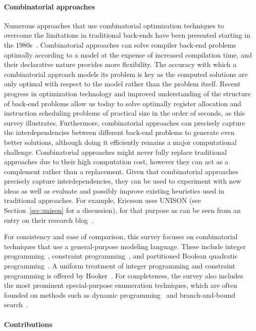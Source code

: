 \documentclass[acmsmall,authorversion,nonacm]{acmart}
\begin{document}
\paragraph{Combinatorial approaches}

Numerous approaches that use combinatorial optimization techniques to
overcome the limitations in traditional back-ends have been presented
starting in the 1980s~\cite{Kremer1997}.
Combinatorial approaches can solve compiler back-end problems
optimally according to a model at the expense of increased compilation
time, and their declarative nature provides more flexibility.
The accuracy with which a combinatorial approach models its problem is
key as the computed solutions are only optimal with respect to the
model rather than the problem itself.
Recent progress in optimization technology and improved understanding
of the structure of back-end problems allow us today to solve
optimally register allocation and instruction scheduling problems of
practical size in the order of seconds, as this survey illustrates.
Furthermore, combinatorial approaches can precisely capture the
interdependencies between different back-end problems to generate even
better solutions, although doing it efficiently remains a major
computational challenge.
Combinatorial approaches might never fully replace traditional
approaches due to their high computation cost, however they can act as
a complement rather than a replacement. Given that combinatorial
approaches precisely capture interdependencies, they can be used to
experiment with new ideas as well as evaluate and possibly improve
existing heuristics used in traditional approaches. For example,
Ericsson uses UNISON (see Section~\ref{sec:unison} for a discussion),
for that purpose as can be seen from an entry on their research
blog~\cite{ericsson-blog}.

For consistency and ease of comparison, this survey focuses on
combinatorial techniques that use a general-purpose modeling language.
These include integer programming~\cite{Nemhauser1999}, constraint
programming~\cite{CPH:2006}, and partitioned Boolean quadratic
programming~\cite{Scholz2002}.
A uniform treatment of integer programming and constraint programming
is offered by Hooker~\cite{Hooker:2012}.
For completeness, the survey also includes the most prominent
special-purpose enumeration techniques, which are often founded on
methods such as dynamic programming~\cite{Cormen2009} and
branch-and-bound search~\cite{Nemhauser1999}.

\paragraph{Contributions}
\end{document}
